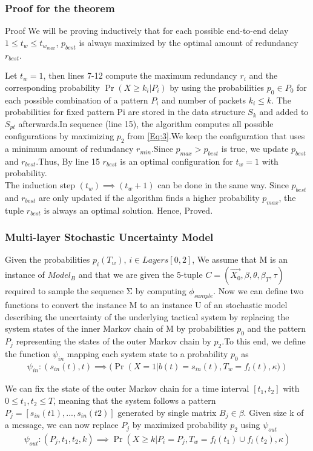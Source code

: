 \documentclass{beamer}
\providecommand{\pr}[1]{\ensuremath{\Pr\left(#1\right)}}
\begin{document}
\begin{frame}[fragile]
\frametitle{Proof for the theorem}
\begin{block}{Proof}
We will be proving inductively that for each possible end-to-end
delay $1 \leq t_w \leq t_{w_{max}}$, $p_{best}$ is always maximized by the
optimal amount of redundancy $r_{best}$.

Let $t_w = 1$, then lines 7-12 compute the maximum redundancy $r_i$ and the corresponding probability $\pr{X \geq k_i|P_i}$ by using the probabilities $p_0 \in P_0$ for each possible combination of a pattern $P_i$ and number of packets $k_i \leq k$. The probabilities
for fixed pattern Pi are stored in the data structure $S_k$ and added to $S_{pt}$ afterwards.In sequence (line 15), the algorithm computes all possible configurations by maximizing $p_2$ from \eqref{Eq:3}.We keep the configuration that uses a minimum amount of redundancy $r_{min}$.Since $p_{max} > p_{best}$ is true, we update $p_{best}$ and $r_{best}$.Thus, By line 15 $r_{best}$ is an optimal configuration for $t_w = 1$ with probability. \\
The induction step $(t_{w}) \implies (t_{w} + 1)$ can be done in the same way. Since $p_{best}$ and $r_{best}$ are only updated if the algorithm finds a higher probability $p_{max}$, the tuple $r_{best}$ is always an optimal solution. Hence, Proved.
\end{block}
\end{frame}
\begin{frame}[fragile]
\frametitle{Multi-layer Stochastic Uncertainty Model}
Given the probabilities $p_{i}(T_{w})$, $i \in Layers[0, 2]$, We assume that M is an instance of $Model_B$ and that we are given the 5-tuple $C= (\overrightarrow{X_0},\beta,\theta,\beta_T,\tau)$ required to sample the sequence Σ by computing $\phi_{sample}$.
Now we can define two functions to convert the instance M to an instance U of an stochastic model describing the uncertainty of the underlying tactical system by replacing the system states of the inner Markov chain of M by probabilities $p_0$ and the pattern $P_j$ representing the states of the outer Markov chain by $p_2$.To this end, we define the function $\psi_{in}$ mapping each system
state to a probability $p_0$ as
\begin{align}
    \psi_{in} : (s_{in}(t),t) \implies (\pr{X=1|b(t)=s_{in}(t),T_w=f_l(t),\kappa)} \label{Eq:12}
\end{align}

We can fix the state of the outer Markov
chain for a time interval $[t_1, t_2]$ with $0 \leq t_{1},t_{2} \leq T$, meaning that the system follows a pattern $P_j = [s_{in}(t1), . . . , s_{in}(t2)]$ generated by single matrix $B_j \in \beta$. Given size k of a message, we can now replace $P_j$ by maximized probability $p_2$ using $\psi_{out}$
\begin{align}
    \psi_{out} : (P_j,t_1,t_2,k) \implies \pr{X \geq k|P_i = P_j,T_w = f_l(t_1) \cup f_l(t_2), \kappa} \label{Eq:13}
\end{align}

\end{frame}
\end{document}

